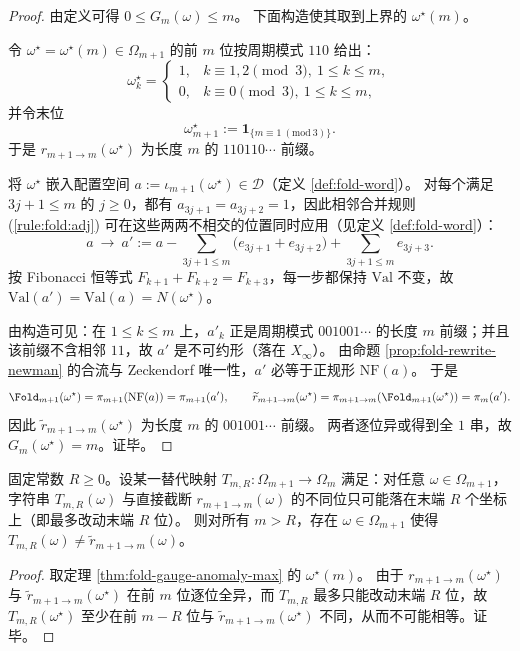 \begin{proof}
由定义可得 \(0\le G_m(\omega)\le m\)。
下面构造使其取到上界的 \(\omega^\star(m)\)。
\par
令 \(\omega^\star=\omega^\star(m)\in\Omega_{m+1}\) 的前 \(m\) 位按周期模式 \(110\) 给出：
$$
\omega^\star_k=
\begin{cases}
1,& k\equiv 1,2\pmod 3,\ 1\le k\le m,\\
0,& k\equiv 0\pmod 3,\ 1\le k\le m,
\end{cases}
$$
并令末位
$$
\omega^\star_{m+1}:=\mathbf{1}_{\{m\equiv 1\ (\mathrm{mod}\ 3)\}}.
$$
于是 \(r_{m+1\to m}(\omega^\star)\) 为长度 \(m\) 的 \(110110\cdots\) 前缀。
\par
将 \(\omega^\star\) 嵌入配置空间 \(a:=\iota_{m+1}(\omega^\star)\in\mathcal D\)（定义 \ref{def:fold-word}）。
对每个满足 \(3j+1\le m\) 的 \(j\ge 0\)，都有 \(a_{3j+1}=a_{3j+2}=1\)，因此相邻合并规则 (\ref{rule:fold:adj}) 可在这些两两不相交的位置同时应用（见定义 \ref{def:fold-word}）：
$$
a\ \to\ a':=a-\sum_{3j+1\le m}\bigl(e_{3j+1}+e_{3j+2}\bigr)+\sum_{3j+1\le m}e_{3j+3}.
$$
按 Fibonacci 恒等式 \(F_{k+1}+F_{k+2}=F_{k+3}\)，每一步都保持 \(\mathrm{Val}\) 不变，故 \(\mathrm{Val}(a')=\mathrm{Val}(a)=N(\omega^\star)\)。
\par
由构造可见：在 \(1\le k\le m\) 上，\(a'_k\) 正是周期模式 \(001001\cdots\) 的长度 \(m\) 前缀；并且该前缀不含相邻 \(11\)，故 \(a'\) 是不可约形（落在 \(X_\infty\)）。
由命题 \ref{prop:fold-rewrite-newman} 的合流与 Zeckendorf 唯一性，\(a'\) 必等于正规形 \(\mathrm{NF}(a)\)。
于是
$$
\Fold_{m+1}(\omega^\star)=\pi_{m+1}(\mathrm{NF}(a))=\pi_{m+1}(a'),
\qquad
\widetilde r_{m+1\to m}(\omega^\star)=\pi_{m+1\to m}(\Fold_{m+1}(\omega^\star))=\pi_m(a').
$$
因此 \(\widetilde r_{m+1\to m}(\omega^\star)\) 为长度 \(m\) 的 \(001001\cdots\) 前缀。
两者逐位异或得到全 \(1\) 串，故 \(G_m(\omega^\star)=m\)。证毕。
\end{proof}

\begin{corollary}\label{cor:fold-tail-patch-incomplete}
固定常数 \(R\ge 0\)。设某一替代映射 \(T_{m,R}:\Omega_{m+1}\to\Omega_m\) 满足：对任意 \(\omega\in\Omega_{m+1}\)，字符串 \(T_{m,R}(\omega)\) 与直接截断 \(r_{m+1\to m}(\omega)\) 的不同位只可能落在末端 \(R\) 个坐标上（即最多改动末端 \(R\) 位）。
则对所有 \(m>R\)，存在 \(\omega\in\Omega_{m+1}\) 使得 \(T_{m,R}(\omega)\ne \widetilde r_{m+1\to m}(\omega)\)。
\end{corollary}

\begin{proof}
取定理 \ref{thm:fold-gauge-anomaly-max} 的 \(\omega^\star(m)\)。
由于 \(r_{m+1\to m}(\omega^\star)\) 与 \(\widetilde r_{m+1\to m}(\omega^\star)\) 在前 \(m\) 位逐位全异，而 \(T_{m,R}\) 最多只能改动末端 \(R\) 位，故 \(T_{m,R}(\omega^\star)\) 至少在前 \(m-R\) 位与 \(\widetilde r_{m+1\to m}(\omega^\star)\) 不同，从而不可能相等。证毕。
\end{proof}

